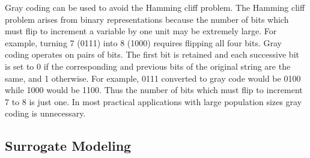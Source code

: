 \documentclass[11pt]{article}
\begin{document}
Gray coding can be used to avoid the Hamming cliff problem. The Hamming cliff problem arises from binary representations because the number of bits which must flip to increment a variable by one unit may be extremely large. For example, turning 7 (0111) into 8 (1000) requires flipping all four bits. Gray coding operates on pairs of bits. The first bit is retained and each successive bit is set to 0 if the corresponding and previous bits of the original string are the same, and 1 otherwise. For example, 0111 converted to gray code would be 0100 while 1000 would be 1100. Thus the number of bits which must flip to increment 7 to 8 is just one. In most practical applications with large population sizes gray coding is unnecessary.

\subsection{Surrogate Modeling}
\end{document}
